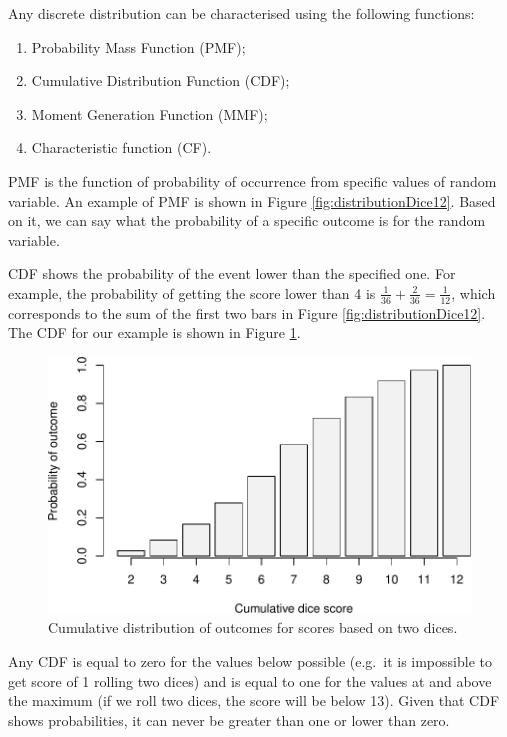 \documentclass[
]{book}
\providecommand{\tightlist}{%
  \setlength{\itemsep}{0pt}\setlength{\parskip}{0pt}}
\theoremstyle{definition}
\theoremstyle{definition}
\theoremstyle{definition}
\theoremstyle{definition}
\theoremstyle{remark}
\begin{document}
Any discrete distribution can be characterised using the following functions:

\begin{enumerate}
\def\labelenumi{\arabic{enumi}.}
\tightlist
\item
  Probability Mass Function (PMF);
\item
  Cumulative Distribution Function (CDF);
\item
  Moment Generation Function (MMF);
\item
  Characteristic function (CF).
\end{enumerate}

PMF is the function of probability of occurrence from specific values of random variable. An example of PMF is shown in Figure \ref{fig:distributionDice12}. Based on it, we can say what the probability of a specific outcome is for the random variable.

CDF shows the probability of the event lower than the specified one. For example, the probability of getting the score lower than 4 is \(\frac{1}{36}+\frac{2}{36}=\frac{1}{12}\), which corresponds to the sum of the first two bars in Figure \ref{fig:distributionDice12}. The CDF for our example is shown in Figure \ref{fig:distributionDice12CDF}.

\begin{figure}
\centering
\includegraphics{Svetunkov---Statistics-for-Business-Analytics_files/figure-latex/distributionDice12CDF-1.pdf}
\caption{\label{fig:distributionDice12CDF}Cumulative distribution of outcomes for scores based on two dices.}
\end{figure}

Any CDF is equal to zero for the values below possible (e.g.~it is impossible to get score of 1 rolling two dices) and is equal to one for the values at and above the maximum (if we roll two dices, the score will be below 13). Given that CDF shows probabilities, it can never be greater than one or lower than zero.
\end{document}
